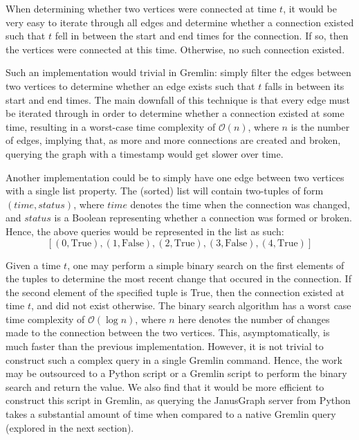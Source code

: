 \documentclass[12pt]{article}
\begin{document}
When determining whether two vertices were connected at time \(t\), it would be very easy to iterate through all edges and determine whether a connection existed such that \(t\) fell in between the start and end times for the connection. If so, then the vertices were connected at this time. Otherwise, no such connection existed.

Such an implementation would trivial in Gremlin: simply filter the edges between two vertices to determine whether an edge exists such that \(t\) falls in between its start and end times. The main downfall of this technique is that every edge must be iterated through in order to determine whether a connection existed at some time, resulting in a worst-case time complexity of \(\mathcal{O}(n)\), where \(n\) is the number of edges, implying that, as more and more connections are created and broken, querying the graph with a timestamp would get slower over time.

\medspace

Another implementation could be to simply have one edge between two vertices with a single list property. The (sorted) list will contain two-tuples of form \((time, status)\), where \(time\) denotes the time when the connection was changed, and \(status\) is a Boolean representing whether a connection was formed or broken. Hence, the above queries would be represented in the list as such:
\[
    [(0, \text{True}), (1, \text{False}), (2, \text{True}), (3, \text{False}), (4, \text{True})]
\]

Given a time \(t\), one may perform a simple binary search on the first elements of the tuples to determine the most recent change that occured in the connection. If the second element of the specified tuple is True, then the connection existed at time \(t\), and did not exist otherwise. The binary search algorithm has a worst case time complexity of \(\mathcal{O}(\log n)\), where \(n\) here denotes the number of changes made to the connection between the two vertices. This, asymptomatically, is much faster than the previous implementation. However, it is not trivial to construct such a complex query in a single Gremlin command. Hence, the work may be outsourced to a Python script or a Gremlin script to perform the binary search and return the value. We also find that it would be more efficient to construct this script in Gremlin, as querying the JanusGraph server from Python takes a substantial amount of time when compared to a native Gremlin query (explored in the next section).
\end{document}
